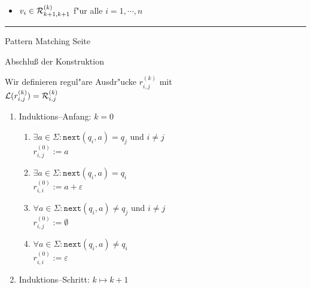 \begin{slide}{}
\begin{enumerate}
\begin{enumerate}
\begin{itemize}
       \item $v_i \in {\cal R}_{k+1,k+1}^{(k)}$ f"ur alle $i=1,\cdots,n$
       \end{itemize}
     \end{enumerate}
\end{enumerate}


\vspace*{\fill}
\tiny \addtocounter{mypage}{1}
\rule{17cm}{1mm}
Pattern Matching \hspace*{\fill} Seite 
\end{slide}


\begin{slide}{}
\normalsize

\begin{center}
  Abschlu{\ss} der Konstruktion
\end{center}

\footnotesize
Wir definieren regul"are Ausdr"ucke $r_{i,j}^{(k)}$ mit \\[0.3cm]
\hspace*{1.3cm} ${\cal L}(r_{i,j}^{(k)}) = {\cal R}_{i,j}^{(k)}$

\begin{enumerate}
\item Induktions--Anfang: $k=0$
  \begin{enumerate}
  \item $\exists a \in \Sigma:\mathtt{next}(q_i, a) = q_j$ und $i \not= j$ \\[0.3cm]
        \hspace*{1.3cm} $r_{i,j}^{(0)} := a$
  \item $\exists a \in \Sigma:\mathtt{next}(q_i, a) = q_i$  \\[0.3cm]
        \hspace*{1.3cm} $r_{i,i}^{(0)} := a + \varepsilon$
  \item $\forall a \in \Sigma:\mathtt{next}(q_i, a) \not= q_j$ und $i\not=j$ \\[0.3cm]
        \hspace*{1.3cm} $r_{i,j}^{(0)} := \emptyset$
  \item $\forall a \in \Sigma:\mathtt{next}(q_i, a) \not= q_i$ \\[0.3cm]
        \hspace*{1.3cm} $r_{i,i}^{(0)} := \varepsilon$
  \end{enumerate}
\item Induktions--Schritt: $k \mapsto k + 1$ 


\end{enumerate}
\end{slide}

